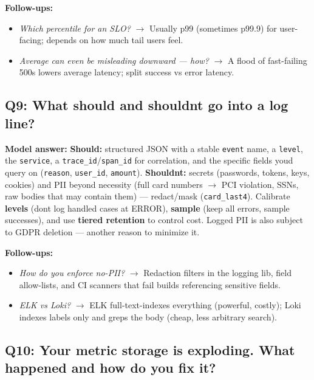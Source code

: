 \documentclass[11pt]{article}
\providecommand{\tightlist}{\setlength{\itemsep}{1pt}\setlength{\parskip}{0pt}}
\begin{document}
\textbf{Follow-ups:}

\begin{itemize}
\tightlist
\item
  \emph{Which percentile for an SLO?} \(\rightarrow\) Usually p99 (sometimes p99.9) for user-facing; depends on how much tail users feel.
\item
  \emph{Average can even be misleading downward --- how?} \(\rightarrow\) A flood of fast-failing 500s lowers average latency; split success vs error latency.
\end{itemize}

\subsection{Q9: What should and shouldn\textquotesingle t go into a log line?}\label{q9-what-should-and-shouldnt-go-into-a-log-line}

\textbf{Model answer:} \textbf{Should:} structured JSON with a stable \texttt{event} name, a \texttt{level}, the \texttt{service}, a \texttt{trace\_id}/\texttt{span\_id} for correlation, and the specific fields you\textquotesingle d query on (\texttt{reason}, \texttt{user\_id}, \texttt{amount}). \textbf{Shouldn\textquotesingle t:} secrets (passwords, tokens, keys, cookies) and PII beyond necessity (full card numbers \(\rightarrow\) PCI violation, SSNs, raw bodies that may contain them) --- redact/mask (\texttt{card\_last4}). Calibrate \textbf{levels} (don\textquotesingle t log handled cases at ERROR), \textbf{sample} (keep all errors, sample successes), and use \textbf{tiered retention} to control cost. Logged PII is also subject to GDPR deletion --- another reason to minimize it.

\textbf{Follow-ups:}

\begin{itemize}
\tightlist
\item
  \emph{How do you enforce no-PII?} \(\rightarrow\) Redaction filters in the logging lib, field allow-lists, and CI scanners that fail builds referencing sensitive fields.
\item
  \emph{ELK vs Loki?} \(\rightarrow\) ELK full-text-indexes everything (powerful, costly); Loki indexes labels only and greps the body (cheap, less arbitrary search).
\end{itemize}

\subsection{Q10: Your metric storage is exploding. What happened and how do you fix it?}\label{q10-your-metric-storage-is-exploding-what-happened-and-how-do-you-fix-it}
\end{document}

